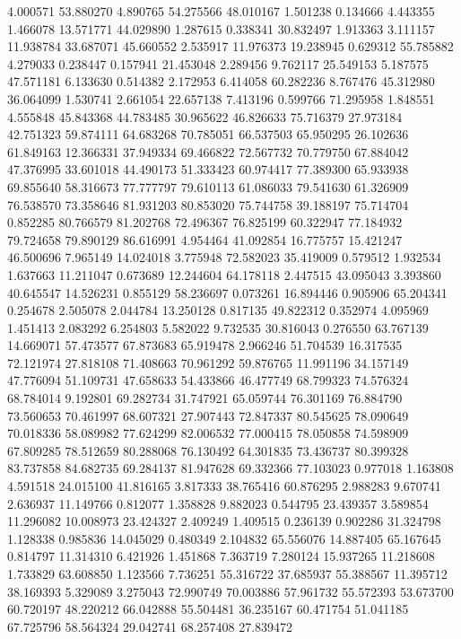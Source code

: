 4.000571
53.880270
4.890765
54.275566
48.010167
1.501238
0.134666
4.443355
1.466078
13.571771
44.029890
1.287615
0.338341
30.832497
1.913363
3.111157
11.938784
33.687071
45.660552
2.535917
11.976373
19.238945
0.629312
55.785882
4.279033
0.238447
0.157941
21.453048
2.289456
9.762117
25.549153
5.187575
47.571181
6.133630
0.514382
2.172953
6.414058
60.282236
8.767476
45.312980
36.064099
1.530741
2.661054
22.657138
7.413196
0.599766
71.295958
1.848551
4.555848
45.843368
44.783485
30.965622
46.826633
75.716379
27.973184
42.751323
59.874111
64.683268
70.785051
66.537503
65.950295
26.102636
61.849163
12.366331
37.949334
69.466822
72.567732
70.779750
67.884042
47.376995
33.601018
44.490173
51.333423
60.974417
77.389300
65.933938
69.855640
58.316673
77.777797
79.610113
61.086033
79.541630
61.326909
76.538570
73.358646
81.931203
80.853020
75.744758
39.188197
75.714704
0.852285
80.766579
81.202768
72.496367
76.825199
60.322947
77.184932
79.724658
79.890129
86.616991
4.954464
41.092854
16.775757
15.421247
46.500696
7.965149
14.024018
3.775948
72.582023
35.419009
0.579512
1.932534
1.637663
11.211047
0.673689
12.244604
64.178118
2.447515
43.095043
3.393860
40.645547
14.526231
0.855129
58.236697
0.073261
16.894446
0.905906
65.204341
0.254678
2.505078
2.044784
13.250128
0.817135
49.822312
0.352974
4.095969
1.451413
2.083292
6.254803
5.582022
9.732535
30.816043
0.276550
63.767139
14.669071
57.473577
67.873683
65.919478
2.966246
51.704539
16.317535
72.121974
27.818108
71.408663
70.961292
59.876765
11.991196
34.157149
47.776094
51.109731
47.658633
54.433866
46.477749
68.799323
74.576324
68.784014
9.192801
69.282734
31.747921
65.059744
76.301169
76.884790
73.560653
70.461997
68.607321
27.907443
72.847337
80.545625
78.090649
70.018336
58.089982
77.624299
82.006532
77.000415
78.050858
74.598909
67.809285
78.512659
80.288068
76.130492
64.301835
73.436737
80.399328
83.737858
84.682735
69.284137
81.947628
69.332366
77.103023
0.977018
1.163808
4.591518
24.015100
41.816165
3.817333
38.765416
60.876295
2.988283
9.670741
2.636937
11.149766
0.812077
1.358828
9.882023
0.544795
23.439357
3.589854
11.296082
10.008973
23.424327
2.409249
1.409515
0.236139
0.902286
31.324798
1.128338
0.985836
14.045029
0.480349
2.104832
65.556076
14.887405
65.167645
0.814797
11.314310
6.421926
1.451868
7.363719
7.280124
15.937265
11.218608
1.733829
63.608850
1.123566
7.736251
55.316722
37.685937
55.388567
11.395712
38.169393
5.329089
3.275043
72.990749
70.003886
57.961732
55.572393
53.673700
60.720197
48.220212
66.042888
55.504481
36.235167
60.471754
51.041185
67.725796
58.564324
29.042741
68.257408
27.839472
